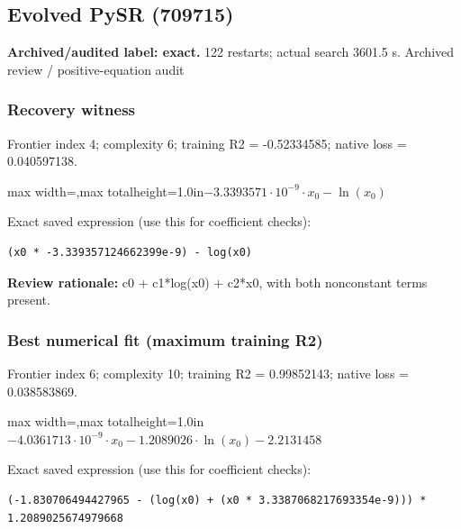 \documentclass[10pt,letterpaper,landscape]{article}
\begin{document}
\begin{minipage}[t]{0.485\textwidth}
\subsection*{Evolved PySR (709715)}
\textbf{Archived/audited label: exact.} 122 restarts; actual search 3601.5 s.
{\small Archived review / positive-equation audit}
\subsubsection*{Recovery witness}
Frontier index 4; complexity 6; training R2 = -0.52334585; native loss = 0.040597138.
\begin{center}\begin{adjustbox}{max width=\linewidth,max totalheight=1.0in}$\displaystyle - 3.3393571 \cdot 10^{-9} \cdot x_{0} - \ln{\left(x_{0} \right)}$\end{adjustbox}\end{center}
{\scriptsize Exact saved expression (use this for coefficient checks):}
\begin{lstlisting}
(x0 * -3.339357124662399e-9) - log(x0)
\end{lstlisting}
{\small\textbf{Review rationale:} c0 + c1*log(x0) + c2*x0, with both nonconstant terms present.}
\subsubsection*{Best numerical fit (maximum training R2)}
Frontier index 6; complexity 10; training R2 = 0.99852143; native loss = 0.038583869.
\begin{center}\begin{adjustbox}{max width=\linewidth,max totalheight=1.0in}$\displaystyle - 4.0361713 \cdot 10^{-9} \cdot x_{0} - 1.2089026 \cdot \ln{\left(x_{0} \right)} - 2.2131458$\end{adjustbox}\end{center}
{\scriptsize Exact saved expression (use this for coefficient checks):}
\begin{lstlisting}
(-1.830706494427965 - (log(x0) + (x0 * 3.3387068217693354e-9))) * 1.2089025674979668
\end{lstlisting}
\end{minipage}
\clearpage{}\label{schechter-10005}
\end{document}
